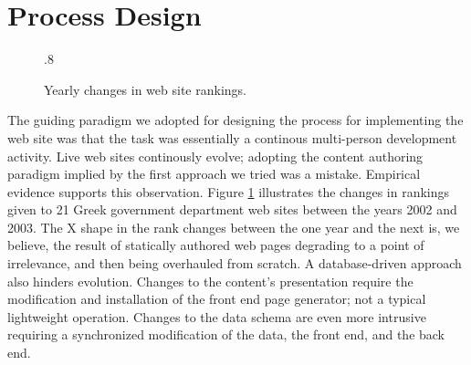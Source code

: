 \documentclass[10pt]{article}
\def\epsfsize#1#2{\ifdim#1>\columnwidth\columnwidth\else#1\fi}
\begin{document}
\section{Process Design}
\label{sec:design}
\begin{figure}
\begin{center}
\leavevmode
\def\epsfsize#1#2{\epsfxsize}
\epsfysize.8\vsize
{}
\end{center}
\caption{
\label{fig:rankyear}
Yearly changes in web site rankings.}
\end{figure}
The guiding paradigm we adopted for designing the process
for implementing the web site was that the task was essentially
a continous multi-person development activity.
Live web sites continously evolve;
adopting the content authoring paradigm implied
by the first approach we tried was a mistake.
Empirical evidence supports this observation.
Figure \ref{fig:rankyear} illustrates the changes
in rankings given to 21 Greek government department
web sites between the years 2002 and 2003.
The X shape in the rank changes between the one year and the next
is, we believe, the result of statically authored web pages
degrading to a point of irrelevance, and then being overhauled
from scratch.
A database-driven approach also hinders evolution.
Changes to the content's presentation require the modification
and installation of the front end page generator;
not a typical lightweight operation.
Changes to the data schema are even more intrusive
requiring a synchronized modification of the data,
the front end, and the back end.
\end{document}
